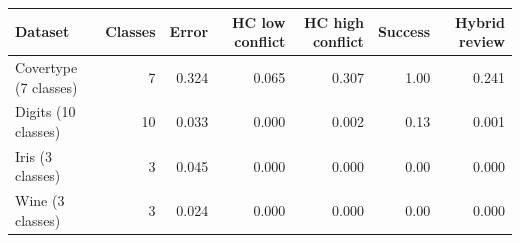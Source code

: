 \begin{tabular}{lrrrrrr}
\toprule
Dataset & Classes & Error & HC low conflict & HC high conflict & Success & Hybrid review \\
\midrule
Covertype (7 classes) & 7 & 0.324 & 0.065 & 0.307 & 1.00 & 0.241 \\
Digits (10 classes) & 10 & 0.033 & 0.000 & 0.002 & 0.13 & 0.001 \\
Iris (3 classes) & 3 & 0.045 & 0.000 & 0.000 & 0.00 & 0.000 \\
Wine (3 classes) & 3 & 0.024 & 0.000 & 0.000 & 0.00 & 0.000 \\
\bottomrule
\end{tabular}
